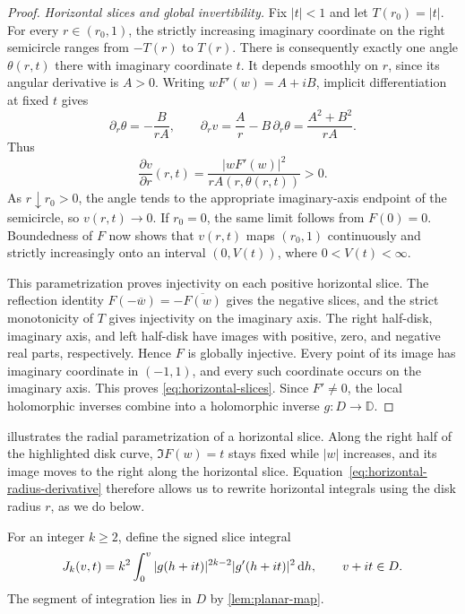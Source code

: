 \begin{proof}
\medskip \noindent\textit{Horizontal slices and global invertibility.} Fix $|t|<1$ and let $T(r_0)=|t|$.  For every $r\in(r_0,1)$, the strictly increasing imaginary coordinate on the right semicircle ranges from $-T(r)$ to $T(r)$.  There is consequently exactly one angle $\theta(r,t)$ there with imaginary coordinate $t$. It depends smoothly on $r$, since its angular derivative is $A>0$. Writing $wF'(w)=A+iB$, implicit differentiation at fixed $t$ gives
\[
 \partial_r\theta=-\frac{B}{rA},
 \qquad
 \partial_r v=\frac{A}{r}-B\,\partial_r\theta
             =\frac{A^2+B^2}{rA}.
\]
Thus
\begin{equation}\label{eq:horizontal-radius-derivative}
 \frac{\partial v}{\partial r}(r,t)
   =\frac{|wF'(w)|^2}{rA(r,\theta(r,t))}>0.
\end{equation}
As $r\downarrow r_0>0$, the angle tends to the appropriate imaginary-axis endpoint of the semicircle, so $v(r,t)\to0$.  If $r_0=0$, the same limit follows from $F(0)=0$.  Boundedness of $F$ now shows that $v(r,t)$ maps $(r_0,1)$ continuously and strictly increasingly onto an interval $(0,V(t))$, where $0<V(t)<\infty$.

This parametrization proves injectivity on each positive horizontal slice.  The reflection identity $F(-\overline w)=-\overline{F(w)}$ gives the negative slices, and the strict monotonicity of $T$ gives injectivity on the imaginary axis. The right half-disk, imaginary axis, and left half-disk have images with positive, zero, and negative real parts, respectively.  Hence $F$ is globally injective.  Every point of its image has imaginary coordinate in $(-1,1)$, and every such coordinate occurs on the imaginary axis. This proves \eqref{eq:horizontal-slices}.  Since $F'\ne0$, the local holomorphic inverses combine into a holomorphic inverse $g:D\to\mathbb{D}$.
\end{proof}

 illustrates the radial parametrization of a horizontal slice.  Along the right half of the highlighted disk curve, $\Im F(w)=t$ stays fixed while $|w|$ increases, and its image moves to the right along the horizontal slice. Equation~\eqref{eq:horizontal-radius-derivative} therefore allows us to rewrite horizontal integrals using the disk radius $r$, as we do below.


For an integer $k\ge2$, define the signed slice integral
\begin{equation}\label{eq:slice-primitive}
 J_k(v,t)=k^2\int_0^v
       |g(h+it)|^{2k-2}|g'(h+it)|^2\,\mathrm{d} h,
 \qquad v+it\in D.
\end{equation}
The segment of integration lies in $D$ by \cref{lem:planar-map}.

